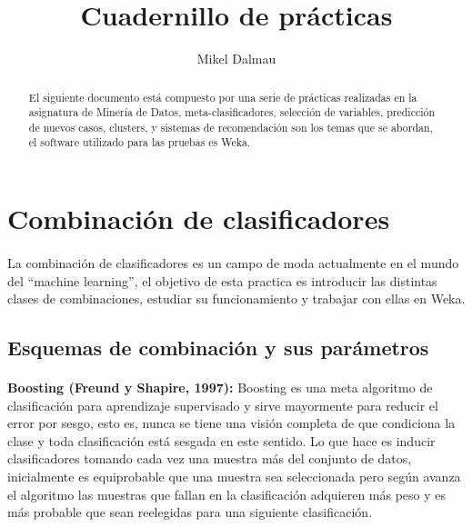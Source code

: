 \documentclass[es]{ifirak}
\begin{document}
\title{Cuadernillo de prácticas}
\author{Mikel Dalmau}

\begin{abstract}
El siguiente documento está compuesto por una serie de prácticas realizadas en la asignatura de Minería de Datos, meta-clasificadores, selección de variables, predicción de nuevos casos, clusters, y sistemas de recomendación son los temas que se abordan, el software utilizado para las pruebas es Weka.
\end{abstract}

\section{Combinación de clasificadores }
\paragraph{}
La combinación de clasificadores es un campo de moda actualmente en el mundo del “machine learning”, el objetivo de esta practica es introducir las distintas clases de combinaciones, estudiar su funcionamiento y trabajar con ellas en Weka.
\subsection{Esquemas de combinación y sus parámetros}

\paragraph{}
\textbf{Boosting (Freund y Shapire, 1997):} Boosting es una meta algoritmo de clasificación para aprendizaje supervisado y sirve mayormente para reducir el error por sesgo, esto es, nunca se tiene una visión completa de que condiciona la clase y toda clasificación está sesgada en este sentido. Lo que hace es inducir clasificadores tomando cada vez una muestra más del conjunto de datos, inicialmente es equiprobable que una muestra sea seleccionada pero según avanza el algoritmo las muestras que fallan en la clasificación adquieren más peso y es más probable que sean reelegidas para una siguiente clasificación.
\end{document}
